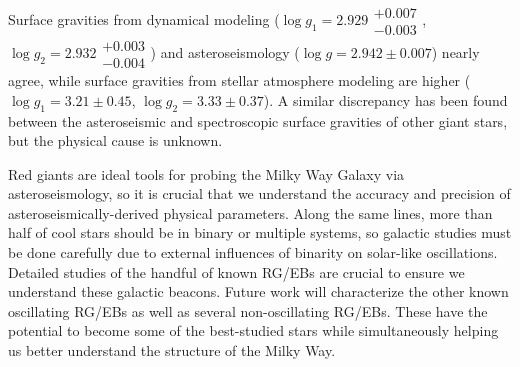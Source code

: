 Surface gravities from dynamical modeling ($\log g_1 = 2.929\substack{+0.007 \\ -0.003}$, $\log g_2 = 2.932\substack{+0.003 \\ -0.004}$) and asteroseismology ($\log g = 2.942 \pm 0.007$) nearly agree, while surface gravities from stellar atmosphere modeling are higher ($\log g_1 = 3.21 \pm 0.45$, $\log g_2 = 3.33 \pm 0.37$). A similar discrepancy has been found between the asteroseismic and spectroscopic surface gravities of other giant stars, but the physical cause is unknown. 

Red giants are ideal tools for probing the Milky Way Galaxy via asteroseismology, so it is crucial that we understand the accuracy and precision of asteroseismically-derived physical parameters. Along the same lines, more than half of cool stars should be in binary or multiple systems, so galactic studies must be done carefully due to external influences of binarity on solar-like oscillations. Detailed studies of the handful of known RG/EBs are crucial to ensure we understand these galactic beacons. Future work will characterize the other known oscillating RG/EBs as well as several non-oscillating RG/EBs. These have the potential to become some of the best-studied stars while simultaneously helping us better understand the structure of the Milky Way.
